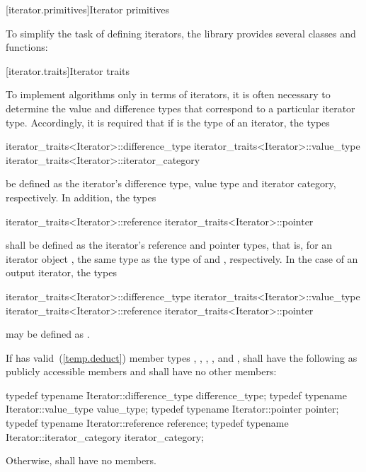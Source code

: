 [iterator.primitives]{Iterator primitives}

\pnum
To simplify the task of defining iterators, the library provides
several classes and functions:

[iterator.traits]{Iterator traits}

\pnum
To implement algorithms only in terms of iterators, it is often necessary to
determine the value and
difference types that correspond to a particular iterator type.
Accordingly, it is required that if
is the type of an iterator,
the types

\begin{codeblock}
iterator_traits<Iterator>::difference_type
iterator_traits<Iterator>::value_type
iterator_traits<Iterator>::iterator_category
\end{codeblock}

be defined as the iterator's difference type, value type and iterator category, respectively.
In addition, the types

\begin{codeblock}
iterator_traits<Iterator>::reference
iterator_traits<Iterator>::pointer
\end{codeblock}

shall be defined as the iterator's reference and pointer types, that is, for an
iterator object , the same type as the type of  and ,
respectively. In the case of an output iterator, the types

\begin{codeblock}
iterator_traits<Iterator>::difference_type
iterator_traits<Iterator>::value_type
iterator_traits<Iterator>::reference
iterator_traits<Iterator>::pointer
\end{codeblock}

may be defined as .

\pnum
If  has valid~(\ref{temp.deduct}) member
types , , ,
, and ,
shall have the following as publicly accessible members
and shall have no other members:
\begin{codeblock}
  typedef typename Iterator::difference_type difference_type;
  typedef typename Iterator::value_type value_type;
  typedef typename Iterator::pointer pointer;
  typedef typename Iterator::reference reference;
  typedef typename Iterator::iterator_category iterator_category;
\end{codeblock}
Otherwise, 
shall have no members.

